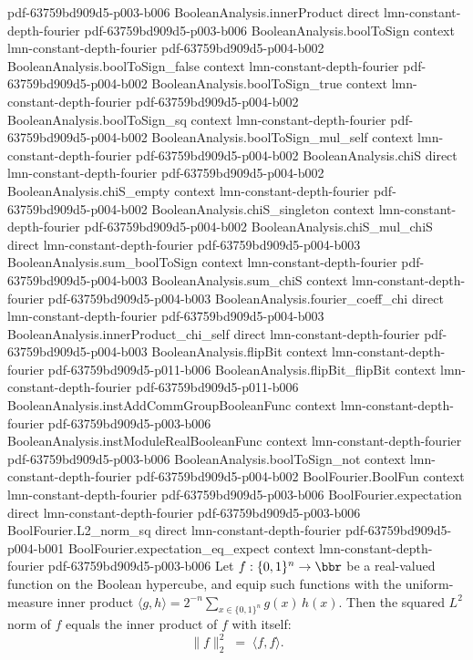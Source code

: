 \begin{lemma}
  {pdf-63759bd909d5-p003-b006}
\proofstep
  {BooleanAnalysis.innerProduct}
  {direct}
  {lmn-constant-depth-fourier}
  {pdf-63759bd909d5-p003-b006}
\proofstep
  {BooleanAnalysis.boolToSign}
  {context}
  {lmn-constant-depth-fourier}
  {pdf-63759bd909d5-p004-b002}
\proofstep
  {BooleanAnalysis.boolToSign_false}
  {context}
  {lmn-constant-depth-fourier}
  {pdf-63759bd909d5-p004-b002}
\proofstep
  {BooleanAnalysis.boolToSign_true}
  {context}
  {lmn-constant-depth-fourier}
  {pdf-63759bd909d5-p004-b002}
\proofstep
  {BooleanAnalysis.boolToSign_sq}
  {context}
  {lmn-constant-depth-fourier}
  {pdf-63759bd909d5-p004-b002}
\proofstep
  {BooleanAnalysis.boolToSign_mul_self}
  {context}
  {lmn-constant-depth-fourier}
  {pdf-63759bd909d5-p004-b002}
\proofstep
  {BooleanAnalysis.chiS}
  {direct}
  {lmn-constant-depth-fourier}
  {pdf-63759bd909d5-p004-b002}
\proofstep
  {BooleanAnalysis.chiS_empty}
  {context}
  {lmn-constant-depth-fourier}
  {pdf-63759bd909d5-p004-b002}
\proofstep
  {BooleanAnalysis.chiS_singleton}
  {context}
  {lmn-constant-depth-fourier}
  {pdf-63759bd909d5-p004-b002}
\proofstep
  {BooleanAnalysis.chiS_mul_chiS}
  {direct}
  {lmn-constant-depth-fourier}
  {pdf-63759bd909d5-p004-b003}
\proofstep
  {BooleanAnalysis.sum_boolToSign}
  {context}
  {lmn-constant-depth-fourier}
  {pdf-63759bd909d5-p004-b003}
\proofstep
  {BooleanAnalysis.sum_chiS}
  {context}
  {lmn-constant-depth-fourier}
  {pdf-63759bd909d5-p004-b003}
\proofstep
  {BooleanAnalysis.fourier_coeff_chi}
  {direct}
  {lmn-constant-depth-fourier}
  {pdf-63759bd909d5-p004-b003}
\proofstep
  {BooleanAnalysis.innerProduct_chi_self}
  {direct}
  {lmn-constant-depth-fourier}
  {pdf-63759bd909d5-p004-b003}
\proofstep
  {BooleanAnalysis.flipBit}
  {context}
  {lmn-constant-depth-fourier}
  {pdf-63759bd909d5-p011-b006}
\proofstep
  {BooleanAnalysis.flipBit_flipBit}
  {context}
  {lmn-constant-depth-fourier}
  {pdf-63759bd909d5-p011-b006}
\proofstep
  {BooleanAnalysis.instAddCommGroupBooleanFunc}
  {context}
  {lmn-constant-depth-fourier}
  {pdf-63759bd909d5-p003-b006}
\proofstep
  {BooleanAnalysis.instModuleRealBooleanFunc}
  {context}
  {lmn-constant-depth-fourier}
  {pdf-63759bd909d5-p003-b006}
\proofstep
  {BooleanAnalysis.boolToSign_not}
  {context}
  {lmn-constant-depth-fourier}
  {pdf-63759bd909d5-p004-b002}
\proofstep
  {BoolFourier.BoolFun}
  {context}
  {lmn-constant-depth-fourier}
  {pdf-63759bd909d5-p003-b006}
\proofstep
  {BoolFourier.expectation}
  {direct}
  {lmn-constant-depth-fourier}
  {pdf-63759bd909d5-p003-b006}
\proofstep
  {BoolFourier.L2_norm_sq}
  {direct}
  {lmn-constant-depth-fourier}
  {pdf-63759bd909d5-p004-b001}
\proofstep
  {BoolFourier.expectation_eq_expect}
  {context}
  {lmn-constant-depth-fourier}
  {pdf-63759bd909d5-p003-b006}
Let $f : \{0,1\}^n \to \bbr$ be a real-valued function on the Boolean hypercube, and
equip such functions with the uniform-measure inner product $\langle g, h \rangle =
2^{-n}\sum_{x \in \{0,1\}^n} g(x)\,h(x)$. Then the squared $L^2$ norm of $f$ equals the
inner product of $f$ with itself:
\[
  \|f\|_2^2 \;=\; \langle f, f \rangle.
\]
\end{lemma}

